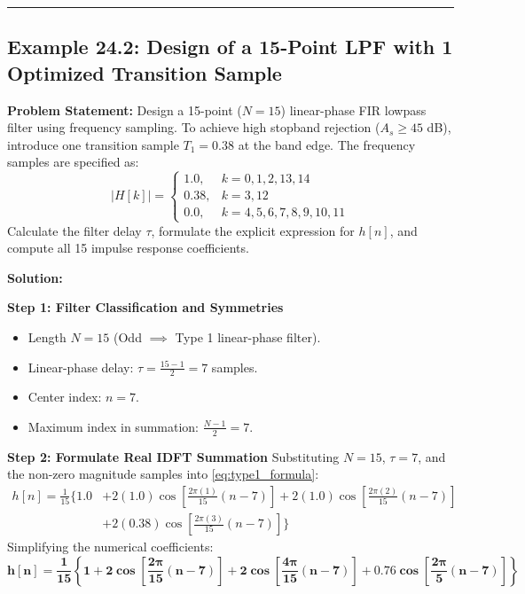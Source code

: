 \documentclass[11pt,a4paper]{article}
\begin{document}
\vspace{3mm}
\noindent\rule{\textwidth}{0.5pt}

\subsection{Example 24.2: Design of a 15-Point LPF with 1 Optimized Transition Sample}
\textbf{Problem Statement:} Design a 15-point ($N=15$) linear-phase FIR lowpass filter using frequency sampling. To achieve high stopband rejection ($A_s \ge 45$ dB), introduce one transition sample $T_1 = 0.38$ at the band edge. The frequency samples are specified as:
\begin{equation}
|H[k]| = \begin{cases} 
1.0, & k = 0, 1, 2, 13, 14 \\ 
0.38, & k = 3, 12 \\ 
0.0, & k = 4, 5, 6, 7, 8, 9, 10, 11 
\end{cases}
\end{equation}
Calculate the filter delay $\tau$, formulate the explicit expression for $h[n]$, and compute all 15 impulse response coefficients.

\vspace{2mm}
\noindent\textbf{Solution:}

\noindent\textbf{Step 1: Filter Classification and Symmetries}
\begin{itemize}
    \item Length $N = 15$ (Odd $\implies$ Type 1 linear-phase filter).
    \item Linear-phase delay: $\tau = \frac{15-1}{2} = 7$ samples.
    \item Center index: $n = 7$.
    \item Maximum index in summation: $\frac{N-1}{2} = 7$.
\end{itemize}

\noindent\textbf{Step 2: Formulate Real IDFT Summation}
Substituting $N=15$, $\tau=7$, and the non-zero magnitude samples into \eqref{eq:type1_formula}:
\begin{align}
h[n] = \frac{1}{15} \bigg\{ 1.0 &+ 2(1.0) \cos\left[\frac{2\pi (1)}{15}(n - 7)\right] + 2(1.0) \cos\left[\frac{2\pi (2)}{15}(n - 7)\right] \nonumber \\
&+ 2(0.38) \cos\left[\frac{2\pi (3)}{15}(n - 7)\right] \bigg\}
\end{align}
Simplifying the numerical coefficients:
\begin{equation}
\mathbf{h[n] = \frac{1}{15} \left\{ 1 + 2\cos\left[\frac{2\pi}{15}(n - 7)\right] + 2\cos\left[\frac{4\pi}{15}(n - 7)\right] + 0.76\cos\left[\frac{2\pi}{5}(n - 7)\right] \right\}}
\end{equation}
\end{document}
